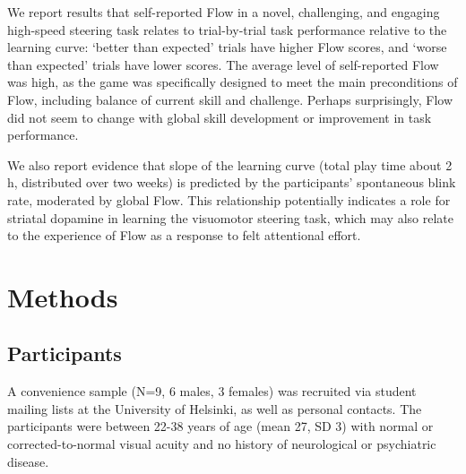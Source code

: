 \documentclass[fleqn,10pt]{wlscirep}
\begin{document}
We report results that self-reported Flow in a novel, challenging, and engaging high-speed steering task relates to trial-by-trial task performance relative to the learning curve: `better than expected' trials have higher Flow scores, and `worse than expected' trials have lower scores. The average level of self-reported Flow was high, as the game was specifically designed to meet the main preconditions of Flow, including balance of current skill and challenge. Perhaps surprisingly, Flow did not seem to change with global skill development or improvement in task performance.

We also report evidence that slope of the learning curve (total play time about 2 h, distributed over two weeks) is predicted by the participants' spontaneous blink rate, moderated by global Flow. This relationship potentially indicates a role for striatal dopamine in learning the visuomotor steering task, which may also relate to the experience of Flow as a response to felt attentional effort.


\section*{Methods}
\subsection*{Participants}
A convenience sample (N=9, 6 males, 3 females) was recruited via student mailing lists at the University of Helsinki, as well as personal contacts. The participants were between 22-38 years of age (mean 27, SD 3) with normal or corrected-to-normal visual acuity and no history of neurological or psychiatric disease.
\end{document}
